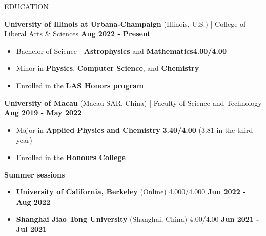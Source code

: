 \documentclass[11pt]{article}
\begin{document}

\begin{section}{EDUCATION}

\textbf{University of Illinois at Urbana-Champaign} (Illinois, U.S.) | College of Liberal Arts \& Sciences \hfill \textbf{Aug 2022 - Present}
\begin{itemize}[leftmargin=1.5em]
    \item Bachelor of Science - \textbf{Astrophysics} and \textbf{Mathematics}\hfill \textbf{4.00/4.00} 
    \item Minor in \textbf{Physics}, \textbf{Computer Science}, and \textbf{Chemistry}
    \item Enrolled in the \textbf{LAS Honors program} 
\end{itemize}

\textbf{University of Macau} (Macau SAR, China) | Faculty of Science and Technology \hfill \textbf{Aug 2019 - May 2022}
\begin{itemize}[leftmargin=1.5em]
    \item Major in \textbf{Applied Physics and Chemistry} \hfill \textbf{3.40/4.00} (3.81 in the third year)
    \item Enrolled in the \textbf{Honours College}
\end{itemize}

\textbf{Summer sessions}
\begin{itemize}[leftmargin=1.5em]
    \item \textbf{University of California, Berkeley} (Online) \hfill 4.000/4.000  \textbf{Jun 2022 - Aug 2022} 
    \item \textbf{Shanghai Jiao Tong University} (Shanghai, China) \hfill 4.00/4.00  \textbf{Jun 2021 - Jul 2021}
\end{itemize}
    
\end{section}
\end{document}
